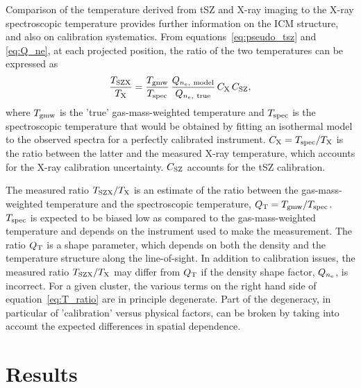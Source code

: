\documentclass[twocolumn,traditabstract]{aa}
\newcommand{\ccor}[1]{\textcolor{Mypink}{#1}}
\def\TSZ {T_{\rm SZX}}
\def\TMW {T_{\rm gmw}}
\def \TX {T_{\rm X}}
\begin{document}
\ccor{Comparison of the temperature derived from tSZ and X-ray imaging to the X-ray spectroscopic temperature provides further information on the ICM structure, and also on calibration systematics. From equations~\ref{eq:pseudo_tsz} and \ref{eq:Q_ne}, at each projected position, the ratio of the two temperatures can be expressed as
\begin{equation}
	\frac{\TSZ }{\TX} = \frac{\TMW}{T_{\rm spec}}\,\frac{Q_{n_{\rm e}, \ {\rm model}}} {Q_{n_{\rm e}, \ {\rm true}}} \, C_{\rm X}\,C_{\rm SZ},
\label{eq:T_ratio}
\end{equation}
where $\TMW$ is the 'true' gas-mass-weighted temperature and $T_{\rm spec}$ is the spectroscopic temperature that would be obtained by fitting an isothermal model to the observed spectra for a perfectly calibrated instrument. $C_{\rm X} = T_{\rm spec}/\TX$ is the ratio between the latter and the measured X-ray temperature, which accounts for the X-ray calibration uncertainty. $C_{\rm SZ}$ accounts for the tSZ calibration.}

\ccor{The measured ratio $\TSZ/\TX$ is an estimate of the ratio between the gas-mass-weighted temperature and the spectroscopic temperature, $Q{_{\rm T}}= \TMW/T_{\rm spec}$. $T_{\rm spec}$ is expected to be biased low as compared to the gas-mass-weighted temperature and depends on the instrument used to make the measurement. The ratio $Q_{\rm T}$ is a shape parameter, which depends on both the density and the temperature structure along the line-of-sight. In addition to calibration issues, the measured ratio $\TSZ/\TX$ may differ from $Q{_{\rm T}}$ if the density shape factor, $Q_{n_{\rm e}}$, is incorrect. For a given cluster, the various terms on the right hand side of equation~\ref{eq:T_ratio} are in principle degenerate. Part of the degeneracy, in particular of 'calibration' versus physical factors, can be broken by taking into account the expected differences in spatial dependence.}

\section{Results}\label{sec:results}
\end{document}
